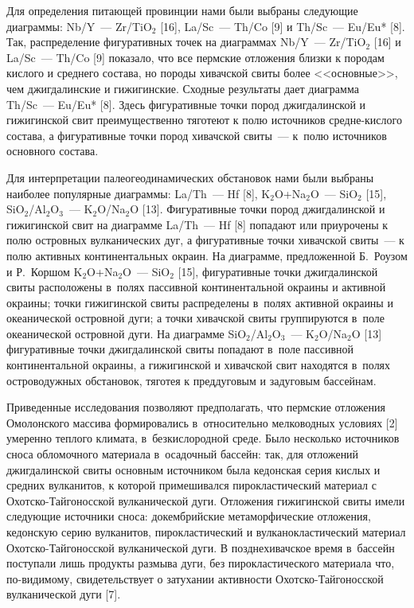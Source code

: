 Для определения питающей провинции нами были выбраны следующие диаграммы: Nb/Y~--- Zr/TiO$_2$ [16], La/Sc~--- Th/Co [9] и Th/Sc~--- Eu/Eu* [8]. Так, распределение фигуративных точек на диаграммах Nb/Y~--- Zr/TiO$_2$ [16] и La/Sc~--- Th/Co [9] показало, что все пермские отложения близки к породам кислого и среднего состава, но породы хивачской свиты более <<основные>>, чем джигдалинские и гижигинские. Сходные результаты дает диаграмма Th/Sc~--- Eu/Eu* [8]. Здесь фигуративные точки пород джигдалинской и гижигинской свит преимущественно тяготеют к полю источников средне-кислого состава, а фигуративные точки пород хивачской свиты~--- к~полю источников основного состава.

Для интерпретации палеогеодинамических обстановок нами были выбраны наиболее популярные диаграммы: La/Th~--- Hf [8], K$_2$O+Na$_2$O~--- SiO$_2$ [15], SiO$_2$/Al$_2$O$_3$~--- K$_2$O/Na$_2$O [13]. Фигуративные точки пород джигдалинской и гижигинской свит на диаграмме La/Th~--- Hf [8] попадают или приурочены к полю островных вулканических дуг, а фигуративные точки хивачской свиты~--- к полю активных континентальных окраин. На диаграмме, предложенной Б.~Роузом и Р.~Коршом K$_2$O+Na$_2$O~--- SiO$_2$ [15], фигуративные точки джигдалинской свиты расположены в~полях пассивной континентальной окраины и активной окраины; точки гижигинской свиты распределены в~полях активной окраины и океанической островной дуги; а точки хивачской свиты группируются в~поле океанической островной дуги. На диаграмме SiO$_2$/Al$_2$O$_3$~--- K$_2$O/Na$_2$O [13] фигуративные точки джигдалинской свиты попадают в~поле пассивной континентальной окраины, а гижигинской и хивачской свит находятся в~полях островодужных обстановок, тяготея к преддуговым и задуговым бассейнам.

Приведенные исследования позволяют предполагать, что пермские отложения Омолонского массива формировались в~относительно мелководных условиях [2] умеренно теплого климата, в~безкислородной среде. Было несколько источников сноса обломочного материала в~осадочный бассейн: так, для отложений джигдалинской свиты основным источником была кедонская серия кислых и средних вулканитов, к которой примешивался пирокластический материал с Охотско-Тайгоносской вулканической дуги. Отложения гижигинской свиты имели следующие источники сноса: докембрийские метаморфические отложения, кедонскую серию вулканитов, пирокластический и вулканокластический материал Охотско-Тайгоносской вулканической дуги. В позднехивачское время в~бассейн поступали лишь продукты размыва дуги, без пирокластического материала что, по-видимому, свидетельствует о затухании активности Охотско-Тайгоносской вулканической дуги [7].

